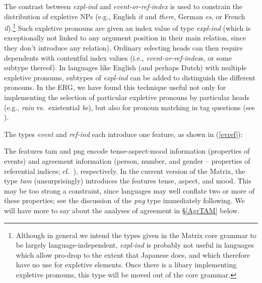 \documentclass[12pt]{article}
\newcommand{\ees}{\eenumsentence}
\begin{document}
The contrast between {\it expl-ind} and {\it event-or-ref-index} is
used to constrain the distribution of expletive NPs (e.g., English
{\it it} and {\it there}, German {\it es}, or French {\it
il}).\footnote{Although in general we intend the types given in the
Matrix core grammar to be largely language-independent,
{\it expl-ind} is probably not useful in languages
which allow pro-drop to the extent that Japanese does, and which therefore
have no use for expletive elements.  Once there is a libary implementing
expletive pronouns, this type will be moved out of the core grammar.}  Such expletive pronouns are given
an {\sc index} value of type {\it expl-ind} (which is exceptionally not
linked to any argument position in their main relation, since they
don't introduce any relation).  Ordinary selecting heads can then require
dependents with
contentful {\sc index} values (i.e., {\it event-or-ref-index}s, or
some subtype thereof).  In languages like English (and perhaps Dutch) with
multiple expletive pronouns, subtypes of {\it expl-ind} can be added
to distinguish the different pronouns.  In the ERG, we have found
this technique useful not only for implementing the selection of
particular expletive pronouns by particular heads (e.g., {\it rain} vs.\
existential {\it be}), but also for pronoun matching in tag questions
(see \citeboth{Ben:Fli:99}).

The types {\it event} and {\it ref-ind} each introduce one feature,
as shown in (\ref{evref}):

\ees{\label{evref}
\item \begin{avm}
{\it event}: \[ tam & tam \]
\end{avm}

\item \begin{avm}
{\it ref-ind}: \[ png & png \]
\end{avm}
}
%
The features {\sc tam} and {\sc png} encode tense-aspect-mood
information (properties of events) and agreement information (person,
number, and gender -- properties of referential indices; cf.\
), respectively.  In the current version of the
Matrix, the type {\it tam} (unsurprisingly) introduces the
features {\sc tense}, {\sc aspect}, and {\sc mood}.  This may be too
strong a constraint, since languages may well conflate two or more of
these properties; see the discussion of the {\it png} type immediately
following.  We will have more to say about the analyses of agreement in
\S\ref{AgrTAM} below.
\end{document}
